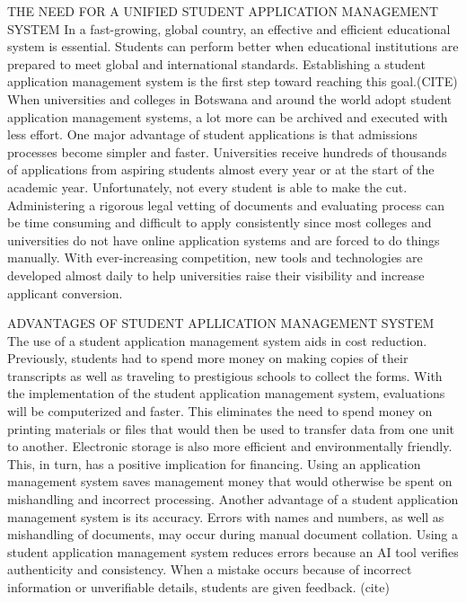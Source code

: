 THE NEED FOR A UNIFIED STUDENT APPLICATION MANAGEMENT SYSTEM
In a fast-growing, global country, an effective and efficient educational system is essential. Students can perform better when educational institutions are prepared to meet global and international standards. Establishing a student application management system is the first step toward reaching this goal.(CITE)
When universities and colleges in Botswana and around the world adopt student application management systems, a lot more can be archived and executed with less effort. One major advantage of student applications is that admissions processes become simpler and faster. Universities receive hundreds of thousands of applications from aspiring students almost every year or at the start of the academic year. Unfortunately, not every student is able to make the cut. Administering a rigorous legal vetting of documents and evaluating process can be time consuming and difficult to apply consistently since most colleges and universities do not have online application systems and are forced to do things manually. With ever-increasing competition, new tools and technologies are developed almost daily to help universities raise their visibility and increase applicant conversion.  

ADVANTAGES OF STUDENT APLLICATION MANAGEMENT SYSTEM
The use of a student application management system aids in cost reduction. Previously, students had to spend more money on making copies of their transcripts as well as traveling to prestigious schools to collect the forms. With the implementation of the student application management system, evaluations will be computerized and faster. This eliminates the need to spend money on printing materials or files that would then be used to transfer data from one unit to another. Electronic storage is also more efficient and environmentally friendly. This, in turn, has a positive implication for financing. Using an application management system saves management money that would otherwise be spent on mishandling and incorrect processing.
Another advantage of a student application management system is its accuracy. Errors with names and numbers, as well as mishandling of documents, may occur during manual document collation. Using a student application management system reduces errors because an AI tool verifies authenticity and consistency. When a mistake occurs because of incorrect information or unverifiable details, students are given feedback. (cite)

